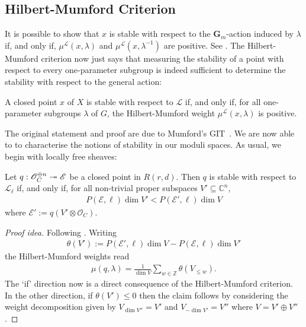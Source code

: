 \documentclass[12pt]{ociamthesis}  %
\begin{document}
\subsection{Hilbert-Mumford Criterion}

It is possible to show that $x$ is stable with
respect to the $\mathbf G_m$-action induced by $\lambda$ if, and only
if, $\mu^{\mathscr L}(x,\lambda)$ and $\mu^{\mathscr L}(x,\lambda^{-1})$
are positive.
See \cite[Lemma 6.9]{hoskins2016}.
The Hilbert-Mumford criterion now just says that measuring the
stability of a point with respect to every one-parameter subgroup
is indeed sufficient to determine the stability with respect to the
general action:

\begin{theorem}
  A closed point $x$ of $X$ is stable with
  respect to $\mathscr L$ if, and only if, for all one-parameter
  subgroups $\lambda$ of $G$, the Hilbert-Mumford weight
  $\mu^{\mathscr L}(x,\lambda)$ is positive.
\end{theorem}

The original statement and proof are due to Mumford's GIT~\cite{mumford1963}.
We are now able to to characterise the notions of stability
in our moduli spaces. As usual, we begin with locally free sheaves:

\begin{example}\label{ex:lf_git_stability}
  Let $q : \mathscr O^{\oplus n}_C \twoheadrightarrow \mathscr E$ be a closed point
  in $R(r,d)$. Then $q$ is stable with respect to $\mathscr L_\ell$
  if, and only if, for all non-trivial proper subspaces
  $V'\subseteq \mathbb C^n$,
  \begin{align}\label{eq:git_stable_sheaf}
    P(\mathscr E,\ell)\dim V'< P(\mathscr E',\ell)\dim V
  \end{align}
  where $\mathscr E' := q(V'\otimes\mathscr O_C)$.
  \begin{proof}[Proof idea]
    Following \cite[Lemma 4.4.5]{huybrechts2010}. Writing
    \begin{align*}
      \theta(V') := P(\mathscr E',\ell)\dim V-P(\mathscr E,\ell)\dim V'
    \end{align*}
    the Hilbert-Mumford weights read
    \begin{align*}
      \mu(q,\lambda) = \frac{1}{\dim V}\sum_{w\in\mathbb Z} \theta(V_{\leq w}).
    \end{align*}
    The `if' direction now is a direct consequence of the Hilbert-Mumford
    criterion. In the other direction, if $\theta(V')\leq 0$ then the
    claim follows by considering the weight decomposition given by
    $V_{\dim V''} = V'$ and $V_{-\dim V'} = V''$
    where $V = V' \oplus V''$.
  \end{proof}
\end{example}
\end{document}
